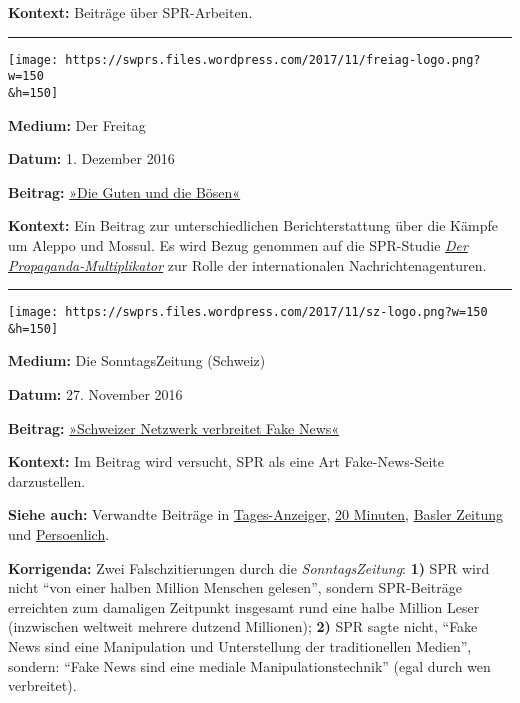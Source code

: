 \textbf{Kontext:} Beiträge über SPR-Arbeiten.

\begin{center}\rule{0.5\linewidth}{\linethickness}\end{center}

\texttt{[image: https://swprs.files.wordpress.com/2017/11/freiag-logo.png?w=150\\\&h=150]}

\textbf{Medium:} Der Freitag

\textbf{Datum:} 1. Dezember 2016

\textbf{Beitrag:}
\href{https://www.freitag.de/autoren/daniela-dahn/die-guten-und-die-boesen}{»Die
Guten und die Bösen«}

\textbf{Kontext:} Ein Beitrag zur unterschiedlichen Berichterstattung
über die Kämpfe um Aleppo und Mossul. Es wird Bezug genommen auf die
SPR-Studie
\emph{\href{https://swprs.org/der-propaganda-multiplikator/}{Der
Propaganda-Multiplikator}} zur Rolle der internationalen
Nachrichtenagenturen.

\begin{center}\rule{0.5\linewidth}{\linethickness}\end{center}

\texttt{[image: https://swprs.files.wordpress.com/2017/11/sz-logo.png?w=150\\\&h=150]}

\textbf{Medium:} Die SonntagsZeitung (Schweiz)

\textbf{Datum:} 27. November 2016

\textbf{Beitrag:}
\href{https://swprs.files.wordpress.com/2017/11/sonntagszeitung-161127.pdf}{»Schweizer
Netzwerk verbreitet Fake News«}

\textbf{Kontext:} Im Beitrag wird versucht, SPR als eine Art
Fake-News-Seite darzustellen.

\textbf{Siehe auch:} Verwandte Beiträge in
\href{https://www.tagesanzeiger.ch/sonntagszeitung/verzerrte-fakten/story/10820415}{Tages-Anzeiger},
\href{https://www.20min.ch/schweiz/news/story/Fake-News-made-in-Switzerland-17053498}{20
Minuten},
\href{https://bazonline.ch/schweiz/standard/FakeNews-made-in-Switzerland/story/20233033}{Basler
Zeitung} und
\href{http://www.persoenlich.com/medien/auch-in-der-schweiz-gibt-es-verzerrte-fakten}{Persoenlich}.

\textbf{Korrigenda:} Zwei Falschzitierungen durch die
\emph{SonntagsZeitung}: \textbf{1)} SPR wird nicht ``von einer halben
Million Menschen gelesen'', sondern SPR-Beiträge erreichten zum
damaligen Zeitpunkt insgesamt rund eine halbe Million Leser (inzwischen
weltweit mehrere dutzend Millionen); \textbf{2)} SPR sagte nicht, ``Fake
News sind eine Manipulation und Unterstellung der traditionellen
Medien'', sondern: ``Fake News sind eine mediale Manipulationstechnik''
(egal durch wen verbreitet).

